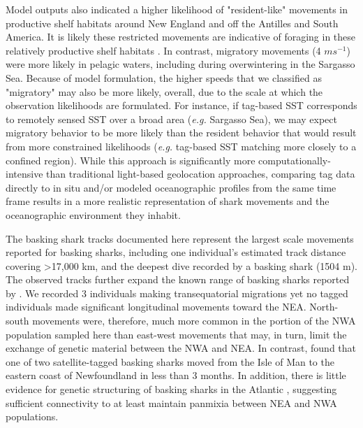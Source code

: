 Model outputs also indicated a higher likelihood of "resident-like" movements in productive shelf habitats around New England and off the Antilles and South America. It is likely these restricted movements are indicative of foraging in these relatively productive shelf habitats \citep{Mourato2014}. In contrast, migratory movements (4 $m s^{-1}$) were more likely in pelagic waters, including during overwintering in the Sargasso Sea. Because of model formulation, the higher speeds that we classified as "migratory" may also be more likely, overall, due to the scale at which the observation likelihoods are formulated. For instance, if tag-based SST corresponds to remotely sensed SST over a broad area (\emph{e.g.} Sargasso Sea), we may expect migratory behavior to be more likely than the resident behavior that would result from more constrained likelihoods (\emph{e.g.} tag-based SST matching more closely to a confined region). While this approach is significantly more computationally-intensive than traditional light-based geolocation approaches, comparing tag data directly to in situ and/or modeled oceanographic profiles from the same time frame results in a more realistic representation of shark movements and the oceanographic environment they inhabit.

The basking shark tracks documented here represent the largest scale movements reported for basking sharks, including one individual’s estimated track distance covering >17,000 km, and the deepest dive recorded by a basking shark (1504 m). The observed tracks further expand the known range of basking sharks reported by \citep*{Skomal2009}. We recorded 3 individuals making transequatorial migrations yet no tagged individuals made significant longitudinal movements toward the NEA. North-south movements were, therefore, much more common in the portion of the NWA population sampled here than east-west movements that may, in turn, limit the exchange of genetic material between the NWA and NEA. In contrast, \citep*{Gore2008} found that one of two satellite-tagged basking sharks moved from the Isle of Man to the eastern coast of Newfoundland in less than 3 months. In addition, there is little evidence for genetic structuring of basking sharks in the Atlantic \citep*{Hoelzel2006}, suggesting sufficient connectivity to at least maintain panmixia between NEA and NWA populations.

